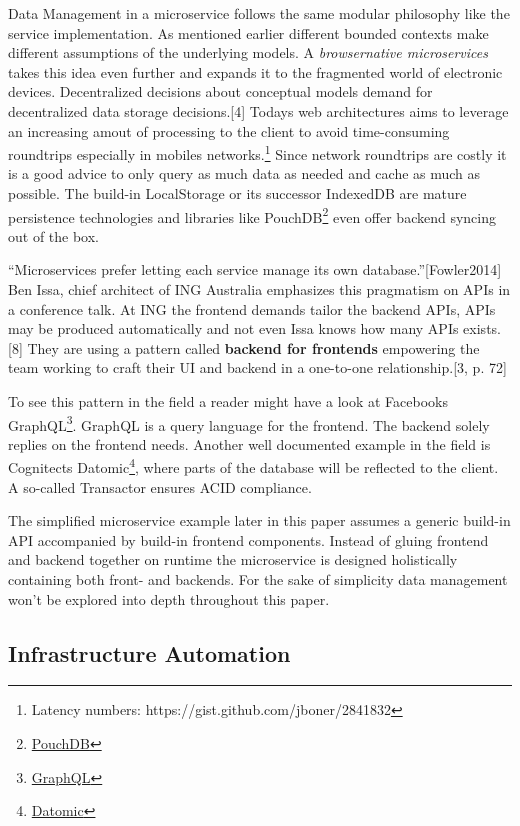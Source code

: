 \documentclass[]{article}
\begin{document}
Data Management in a microservice follows the same modular philosophy
like the service implementation. As mentioned earlier different bounded
contexts make different assumptions of the underlying models. A
\emph{browsernative microservices} takes this idea even further and
expands it to the fragmented world of electronic devices. Decentralized
decisions about conceptual models demand for decentralized data storage
decisions.{[}4{]} Todays web architectures aims to leverage an
increasing amout of processing to the client to avoid time-consuming
roundtrips especially in mobiles networks.\footnote{Latency numbers:
  https://gist.github.com/jboner/2841832} Since network roundtrips are
costly it is a good advice to only query as much data as needed and
cache as much as possible. The build-in LocalStorage or its successor
IndexedDB are mature persistence technologies and libraries like
PouchDB\footnote{\href{https://pouchdb.com/}{PouchDB}} even offer
backend syncing out of the box.

``Microservices prefer letting each service manage its own
database.''{[}Fowler2014{]} Ben Issa, chief architect of ING Australia
emphasizes this pragmatism on APIs in a conference talk. At ING the
frontend demands tailor the backend APIs, APIs may be produced
automatically and not even Issa knows how many APIs exists.{[}8{]} They
are using a pattern called \textbf{backend for frontends} empowering the
team working to craft their UI and backend in a one-to-one
relationship.{[}3, p. 72{]}

To see this pattern in the field a reader might have a look at Facebooks
GraphQL\footnote{\href{http://graphql.org/}{GraphQL}}. GraphQL is a
query language for the frontend. The backend solely replies on the
frontend needs. Another well documented example in the field is
Cognitects Datomic\footnote{\href{http://www.datomic.com/}{Datomic}},
where parts of the database will be reflected to the client. A so-called
Transactor ensures ACID compliance.

The simplified microservice example later in this paper assumes a
generic build-in API accompanied by build-in frontend components.
Instead of gluing frontend and backend together on runtime the
microservice is designed holistically containing both front- and
backends. For the sake of simplicity data management won't be explored
into depth throughout this paper.

\subsection{Infrastructure Automation}\label{infrastructure-automation}
\end{document}
